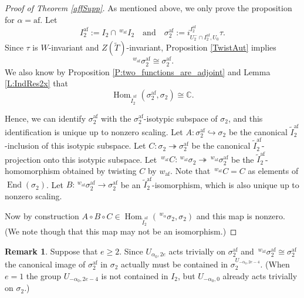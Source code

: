 \documentclass[10pt, letterpaper]{amsart}
\theoremstyle{plain}
\theoremstyle{definition}
\newtheorem*{Rmk}{Remark}
\numberwithin{equation}{section}
\newcommand{\It}{\widetilde{I}}
\newcommand{\Tt}{\widetilde{T}}
\newcommand{\End}{\operatorname{End}}
\newcommand{\Hom}{\operatorname{Hom}}
\newcommand{\af}{\mathrm{af}}
\newcommand{\Hcal}{\mathcal{H}}
\newcommand{\qand}{{\quad\text{and}\quad}}
\begin{document}
\begin{proof}[Proof of Theorem \ref{affSupp}] 
As mentioned above, we only prove the proposition for $\alpha=\af$. Let
\[
I_{2}^{\af}:= I_2\cap \,^{w_{\af}} I_2\qand\sigma_{2}^{\af}:=i_{U^{-}_{2}\cap I_2^{\af},U_{0}}^{ I_2^{\af}}\tau.
\]
Since $\tau$ is $W$-invariant and $Z(\Tt)$-invariant, Proposition \ref{TwistAut} implies
\[
\,^{w_{\af}}\sigma_{2}^{\af}\cong \sigma_{2}^{\af}.
\]
We also know by Proposition \ref{P:two_functions_are_adjoint} and Lemma \ref{L:IndRes2x} that
\[
\Hom_{\It_2^{\af}}(\sigma_{2}^{\af},\sigma_{2})\cong \mathbb{C}.
\]

Hence, we can identify $\sigma_{2}^{\af}$ with the $\sigma_{2}^{\af}$-isotypic subspace of $\sigma_{2}$, and this identification is unique up to nonzero scaling. Let $A:\sigma_{2}^{\af}\hookrightarrow \sigma_{2}$ be the canonical $\It_2^{\af}$-inclusion of this isotypic subspace. Let $C:\sigma_{2}\twoheadrightarrow \sigma_{2}^{\af}$ be the canonical $\It_2^{\af}$-projection onto this isotypic subspace. Let $\,^{w_{\af}}C:\,^{w_{\af}}\sigma_{2}\twoheadrightarrow \,^{w_{\af}}\sigma_{2}^{\af}$ be the $\It_2^{\af}$-homomorphism obtained by twisting $C$ by $w_{\af}$. Note that $\,^{w_{\af}}C=C$ as elements of $\End(\sigma_{2})$. Let $B:\,^{w_{\af}}\sigma_{2}^{\af}\rightarrow \sigma_{2}^{\af}$ be an $\It_2^{\af}$-isomorphism, which is also unique up to nonzero scaling.

Now by construction $A\circ B\circ C\in\Hom_{\It_2^{\af}}(\,^{w_{\alpha}}\sigma_{2},\sigma_{2})$ and this map is nonzero. (We note though that this map may not be an isomorphism.)
\end{proof}

\begin{Rmk}
    Suppose that $e\geq 2$. Since $U_{\alpha_{0},2e}$ acts trivially on $\sigma_{2}^{\af}$ and $\,^{w_{\af}}\sigma_{2}^{\af}\cong \sigma_{2}^{\af}$ the canonical image of $\sigma_{2}^{\af}$ in $\sigma_{2}$ actually must be contained in $\sigma_{2}^{U_{-\alpha_{0},2e-4}}$. (When $e=1$ the group $U_{-\alpha_{0},2e-4}$ is not contained in $I_{2}$, but $U_{-\alpha_{0},0}$ already acts trivially on $\sigma_{2}$.)
    
\end{Rmk}

\end{document}
